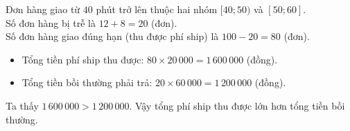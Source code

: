 \begin{ex}
{\begin{itemchoice}
			\itemch Đơn hàng giao từ $40$ phút trở lên thuộc hai nhóm $[40; 50)$ và $[50; 60]$. \\
			Số đơn hàng bị trễ là $12 + 8 = 20$ (đơn). \\
			Số đơn hàng giao đúng hạn (thu được phí ship) là $100-20=80$ (đơn).
			\begin{itemize}
				\item Tổng tiền phí ship thu được: $80 \times 20\,000 = 1\,600\,000$ (đồng).
				\item Tổng tiền bồi thường phải trả: $20 \times 60\,000 = 1\,200\,000$ (đồng).
			\end{itemize}
			Ta thấy $1\,600\,000 > 1\,200\,000$. Vậy tổng phí ship thu được lớn hơn tổng tiền bồi thường.
		\end{itemchoice}
	}
\end{ex}


